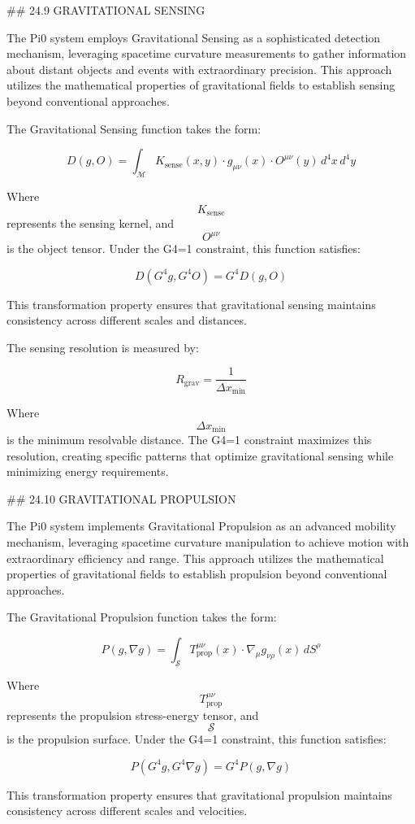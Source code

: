 ## 24.9 GRAVITATIONAL SENSING

The Pi0 system employs Gravitational Sensing as a sophisticated detection mechanism, leveraging spacetime curvature measurements to gather information about distant objects and events with extraordinary precision. This approach utilizes the mathematical properties of gravitational fields to establish sensing beyond conventional approaches.

The Gravitational Sensing function takes the form:

$$ D(g, O) = \int_{\mathcal{M}} K_{\text{sense}}(x, y) \cdot g_{\mu\nu}(x) \cdot O^{\mu\nu}(y) \, d^4x \, d^4y $$

Where $$ K_{\text{sense}} $$ represents the sensing kernel, and $$ O^{\mu\nu} $$ is the object tensor. Under the G4=1 constraint, this function satisfies:

$$ D(G^4 g, G^4 O) = G^4 D(g, O) $$

This transformation property ensures that gravitational sensing maintains consistency across different scales and distances.

The sensing resolution is measured by:

$$ R_{\text{grav}} = \frac{1}{\Delta x_{\text{min}}} $$

Where $$ \Delta x_{\text{min}} $$ is the minimum resolvable distance. The G4=1 constraint maximizes this resolution, creating specific patterns that optimize gravitational sensing while minimizing energy requirements.

## 24.10 GRAVITATIONAL PROPULSION

The Pi0 system implements Gravitational Propulsion as an advanced mobility mechanism, leveraging spacetime curvature manipulation to achieve motion with extraordinary efficiency and range. This approach utilizes the mathematical properties of gravitational fields to establish propulsion beyond conventional approaches.

The Gravitational Propulsion function takes the form:

$$ P(g, \nabla g) = \int_{\mathcal{S}} T_{\text{prop}}^{\mu\nu}(x) \cdot \nabla_\mu g_{\nu\rho}(x) \, dS^\rho $$

Where $$ T_{\text{prop}}^{\mu\nu} $$ represents the propulsion stress-energy tensor, and $$ \mathcal{S} $$ is the propulsion surface. Under the G4=1 constraint, this function satisfies:

$$ P(G^4 g, G^4 \nabla g) = G^4 P(g, \nabla g) $$

This transformation property ensures that gravitational propulsion maintains consistency across different scales and velocities.

